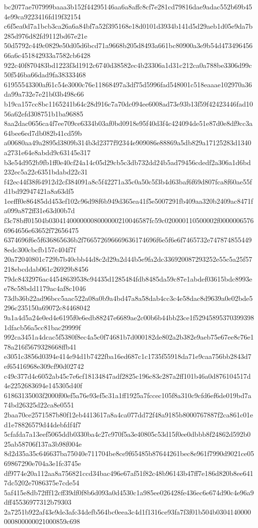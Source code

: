 {bc2077ae707999baaa3b152f44295146aa6a8affc8cf7e281cd79816dae9adac552b69b454e99ca9223416fd19f32154
c6f5ea0d7a1bcb3ca26a6a84bf7a52f395168e18d0101d3934b141d5d29aeb1d05e9da7b285d976d82fd9112bd67e21e
50d5792c449c0829e50d05d6bcd71a9668b205d8493a661bc80900a3e9b54d47349645666a6c451842933a7582cb6428
922c40f870483bd1223f3d1912c6740d38582ec4b23306a1d31c212ca0a788be3306d99c50f546ba66dad9fa38333468
61955543300af61c54e3000c76e11868497a3df75d5996fad548001c518eaaae102970a36da99a732e7e21b03b498c66
b19ca157cc8bc1165241b64c28d916c7a70dc094ee6008ad73e93b13f59f42423446fad1056a62efd308751b1ba96885
8aa2dac0656ca4f7ee709ce6334b03af0bd0918e95f40d3f4c424094de51e87d0e8df9cc3a64bee6ed7db082b41cd59b
a00680aa49a2895d3809b314b3d2377f92344e909086e88869a5db829a17125283d1340a2731e64e8abdd9c63145e317
b3e54d952b9fb1ff0e40cf24a14c05d29cb5c3db732dd24b5ad79456cdedf2a306a1d6bd232ec5a22c6351bdabd22c31
f42ec44f38f64912d2cf384091a8c5f42271a35c0a50c5f3b4d63baf6f69d807fca8f60ae55fd1bd92947421a8a63df5
1eefff0e86485dd453ef102c96d98f6b949d365ea41f5e5007291fb409aa320b2409ac8471fa099a872ff31e63d00b7d
f3c78bff01504b03041400000008000000210046587fc59c020000110500002f00000065766964656e63652f72656475
6374696f6e5f636865636b2f766572696669636174696f6e5f6e6f7465732e7478748554498edc300cbcfb157c404f7f
20a72040801c729b7b40cbb44d8c2d29a2d44b5e9fa2dc336920087293252e55c5a25f57218ebcddab061c26929b8456
79dc8432976ac44548639538c94435d1285484fdb8485da59c87e1abdef03615bdc8993ee78c58bdd1179ac4af8c1046
73db36b22ad96bcc5aac522a08a0b9a4bd47a8a58dab4cc3c4e58dac8d9639a0e02bde5296c235150a69072c84468042
9a1a4d5a24e0ed4e6195f0e6edb88247e6689ae2c00b6b44bb23ce1f529458953703993981dfacb56a5cc81bac29999f
992ca3451a4dcac5f5380f8ec4a5c0f74681b7d000182de802a2b382e9aeb75e67ee8c76e178a216f5679328668ffb41
e3051c3856d0394e414e94d1b7422fba16ed687c1c1735f55918da71e9caa756bb2843d7ef65416968e309cf90d02742
c49c377d4c6052ab45c7e6cf18134847adf2825c196c83c287a2ff101b46a0d876104517d4e2252683694e145305d40f
61863135003f2000f00ef5a76e93ef5c31a1ff1925a7fccec105f8a310c9cfd6ef6de019bd7a74bd26325d22ca8e0551
2baa70ce2571587b80f12eb4413617a8a4ca077dd72f48a9185b8000767887f2ca861c01ed1e78826579d44debfdf4f7
5cfafda7a13eef5065ddb0330ba4c27c970f5a3e40805c53d15f0ee0dbbb8f24862d592b025ab58706f137a3b98f004e
8d2d35a35c646637ba75040e711704be8ce9f65485b87644261bec8e961f7990d9021ce0569867290e704a3e1fc3745e
df9774e20a112aa8a756821ccd34bac496e67af51f82c48b96143b47ff7e186d820b8ee6417dc5202e7086375e7cde54
5af415e8db72fff12cff39df0f8b6d093a0d4530c1a985ee026428fe436ec6e674d90c4e96a9dff45536977312b79303
2a7251b922af43e9de3afc34defb564bc0eea3c4d1f1316ce93fa7f3f01b504b0304140000000800000021000859c698
}
